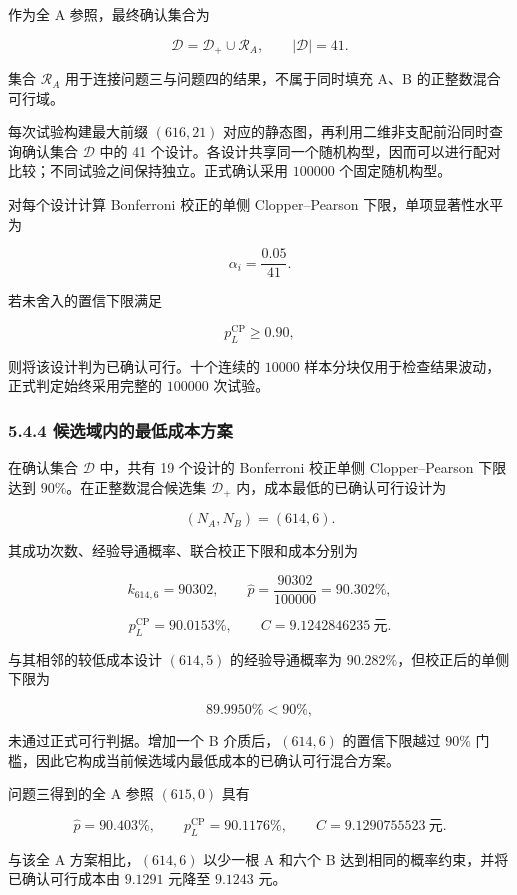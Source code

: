 作为全 A 参照，最终确认集合为

\[
\mathcal D=\mathcal D_+\cup\mathcal R_A,
\qquad |\mathcal D|=41.
\]

集合 \(\mathcal R_A\) 用于连接问题三与问题四的结果，不属于同时填充 A、B 的正整数混合可行域。

每次试验构建最大前缀 \((616,21)\) 对应的静态图，再利用二维非支配前沿同时查询确认集合 \(\mathcal D\) 中的 41 个设计。各设计共享同一个随机构型，因而可以进行配对比较；不同试验之间保持独立。正式确认采用 \(100000\) 个固定随机构型。

对每个设计计算 Bonferroni 校正的单侧 Clopper--Pearson 下限，单项显著性水平为

\[
\alpha_i=\frac{0.05}{41}.
\]

若未舍入的置信下限满足

\[
p_L^{\mathrm{CP}}\geq0.90,
\]

则将该设计判为已确认可行。十个连续的 \(10000\) 样本分块仅用于检查结果波动，正式判定始终采用完整的 \(100000\) 次试验。

\subsubsection{5.4.4 候选域内的最低成本方案}\label{ux56faux5b9aux5bb6ux65cfux5185ux7684ux6210ux672cux63a8ux8350}

在确认集合 \(\mathcal D\) 中，共有 19 个设计的 Bonferroni 校正单侧 Clopper--Pearson 下限达到 \(90\%\)。在正整数混合候选集 \(\mathcal D_+\) 内，成本最低的已确认可行设计为

\[
(N_A,N_B)=(614,6).
\]

其成功次数、经验导通概率、联合校正下限和成本分别为

\[
k_{614,6}=90302,
\qquad
\widehat p=\frac{90302}{100000}=90.302\%,
\]

\[
p_L^{\mathrm{CP}}=90.0153\%,
\qquad
C=9.1242846235\ \text{元}.
\]

与其相邻的较低成本设计 \((614,5)\) 的经验导通概率为 \(90.282\%\)，但校正后的单侧下限为

\[
89.9950\%<90\%,
\]

未通过正式可行判据。增加一个 B 介质后，\((614,6)\) 的置信下限越过 \(90\%\) 门槛，因此它构成当前候选域内最低成本的已确认可行混合方案。

问题三得到的全 A 参照 \((615,0)\) 具有

\[
\widehat p=90.403\%,
\qquad
p_L^{\mathrm{CP}}=90.1176\%,
\qquad
C=9.1290755523\ \text{元}.
\]

与该全 A 方案相比，\((614,6)\) 以少一根 A 和六个 B 达到相同的概率约束，并将已确认可行成本由 \(9.1291\) 元降至 \(9.1243\) 元。

